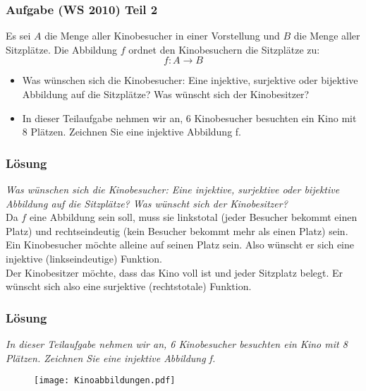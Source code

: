 \begin{frame}
	\frametitle{Aufgabe (WS 2010) Teil 2}
	Es sei $A$ die Menge aller Kinobesucher in einer Vorstellung und $B$ die Menge aller Sitzplätze. Die Abbildung $f$ ordnet den Kinobesuchern die Sitzplätze zu:
	$$ f : A \to B$$
	\begin{itemize}
		\item Was wünschen sich die Kinobesucher: Eine injektive, surjektive oder bijektive Abbildung auf die Sitzplätze? Was wünscht sich der Kinobesitzer?
		\item In dieser Teilaufgabe nehmen wir an, 6 Kinobesucher besuchten ein Kino mit 8 Plätzen. Zeichnen Sie eine injektive Abbildung f.\\
	\end{itemize}
	
\end{frame}

\begin{frame}
	\frametitle{Lösung}
	\textit{Was wünschen sich die Kinobesucher: Eine injektive, surjektive oder bijektive Abbildung auf die Sitzplätze? Was wünscht sich der Kinobesitzer?} \\[2em] \pause
	Da $f$ eine Abbildung sein soll, muss sie linkstotal (jeder Besucher bekommt einen Platz) und rechtseindeutig (kein Besucher bekommt mehr als einen Platz) sein.\\
	\pause
	Ein Kinobesucher möchte alleine auf seinen Platz sein. Also wünscht er sich eine injektive (linkseindeutige) Funktion.\\ 
	\pause 
	Der Kinobesitzer möchte, dass das Kino voll ist und jeder Sitzplatz belegt. Er wünscht sich also eine surjektive (rechtstotale) Funktion.
\end{frame}

\begin{frame}
	\frametitle{Lösung}
	\textit{In dieser Teilaufgabe nehmen wir an, 6 Kinobesucher besuchten ein Kino mit 8 Plätzen. Zeichnen Sie eine injektive Abbildung f.} \\[2em] \pause
	
	\begin{figure}[H]
		\centering
		\texttt{[image: Kinoabbildungen.pdf]}
	\end{figure}
\end{frame}

%	
%	

